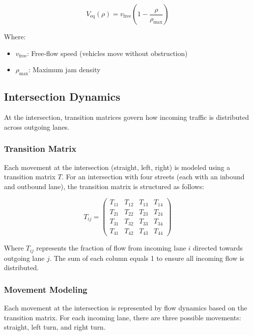\documentclass[conference]{IEEEtran}
\begin{document}
\begin{equation}
V_{\text{eq}}(\rho) = v_{\text{free}} \left( 1 - \frac{\rho}{\rho_{\text{max}}} \right)
\end{equation}

Where:
\begin{itemize}
    \item $v_{\text{free}}$: Free-flow speed (vehicles move without obstruction)
    \item $\rho_{\text{max}}$: Maximum jam density
\end{itemize}

\subsection{Intersection Dynamics}

At the intersection, transition matrices govern how incoming traffic is distributed across outgoing lanes.

\subsubsection{Transition Matrix}
Each movement at the intersection (straight, left, right) is modeled using a transition matrix $T$. For an intersection with four streets (each with an inbound and outbound lane), the transition matrix is structured as follows:

\begin{equation}
T_{ij} = \begin{pmatrix}
T_{11} & T_{12} & T_{13} & T_{14} \\
T_{21} & T_{22} & T_{23} & T_{24} \\
T_{31} & T_{32} & T_{33} & T_{34} \\
T_{41} & T_{42} & T_{43} & T_{44}
\end{pmatrix}
\end{equation}

Where $T_{ij}$ represents the fraction of flow from incoming lane $i$ directed towards outgoing lane $j$. The sum of each column equals 1 to ensure all incoming flow is distributed.

\subsubsection{Movement Modeling}
Each movement at the intersection is represented by flow dynamics based on the transition matrix. For each incoming lane, there are three possible movements: straight, left turn, and right turn.
\end{document}
